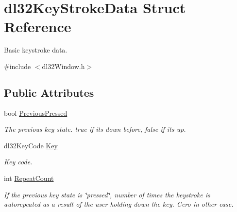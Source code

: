 \hypertarget{structdl32_key_stroke_data}{\section{dl32\-Key\-Stroke\-Data Struct Reference}
\label{structdl32_key_stroke_data}
}


Basic keystroke data.  




{\ttfamily \#include $<$dl32\-Window.\-h$>$}

\subsection*{Public Attributes}
\begin{DoxyCompactItemize}
\item 
\hypertarget{structdl32_key_stroke_data_a8224b3f8c8db74f78685b72080a07d42}{bool \hyperlink{structdl32_key_stroke_data_a8224b3f8c8db74f78685b72080a07d42}{Previous\-Pressed}}\label{structdl32_key_stroke_data_a8224b3f8c8db74f78685b72080a07d42}

\begin{DoxyCompactList}\small\item\em The previous key state. true if its down before, false if its up. \end{DoxyCompactList}\item 
\hypertarget{structdl32_key_stroke_data_abd6d0bc006296813179559a8aa0d86d6}{dl32\-Key\-Code \hyperlink{structdl32_key_stroke_data_abd6d0bc006296813179559a8aa0d86d6}{Key}}\label{structdl32_key_stroke_data_abd6d0bc006296813179559a8aa0d86d6}

\begin{DoxyCompactList}\small\item\em Key code. \end{DoxyCompactList}\item 
\hypertarget{structdl32_key_stroke_data_a37e94ffa284784cc7a00214fcc31c1c9}{int \hyperlink{structdl32_key_stroke_data_a37e94ffa284784cc7a00214fcc31c1c9}{Repeat\-Count}}\label{structdl32_key_stroke_data_a37e94ffa284784cc7a00214fcc31c1c9}

\begin{DoxyCompactList}\small\item\em If the previous key state is \char`\"{}pressed\char`\"{}, number of times the keystroke is autorepeated as a result of the user holding down the key. Cero in other case. \end{DoxyCompactList}\end{DoxyCompactItemize}



